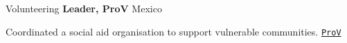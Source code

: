 \begin{rubric}{Volunteering}
\noentry{~}
\entry*[08/2018 -- 07/2020]
\textbf{Leader, ProV} \hfill Mexico\par
Coordinated a social aid organisation to support vulnerable communities.
\hfill 
{} 
\href{https://www.facebook.com/groups/782118565323194}{\texttt{ProV}}

\end{rubric}


